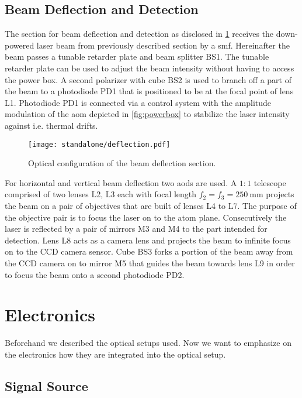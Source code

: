 \subsection{Beam Deflection and Detection}
\label{sec:deflection}

The section for beam deflection and detection as disclosed in
\cref{fig:deflection} receives the down-powered laser beam from previously
described section by a \gls{smf}. Hereinafter the beam passes a tunable
retarder plate and beam splitter BS1. The tunable retarder plate can be used
to adjust the beam intensity without having to access the power box.
A second polarizer with cube BS2 is used to branch off a part of the beam
to a photodiode PD1 that is positioned to be at the focal point of lens L1.
Photodiode PD1 is connected via a control system with the amplitude
modulation of the \gls{aom} depicted in \cref{fig:powerbox} to stabilize
the laser intensity against i.e. thermal drifts.

\begin{figure}[h]
  \centering
  \texttt{[image: standalone/deflection.pdf]}
  \caption{Optical configuration of the beam deflection section.}
  \label{fig:deflection}
\end{figure}

For horizontal and vertical beam deflection two \gls{aod}s are used. A $1:1$
telescope comprised of two lenses L2, L3
each with focal length $f_2=f_3=\SI{250}{\milli\meter}$ projects the beam
on a pair of objectives that are built of lenses L4 to L7. The purpose of the
objective pair is to focus the laser on to the atom plane.
Consecutively the laser is reflected by a pair of mirrors M3 and M4 to the
part intended for detection. Lens L8 acts as a camera lens and projects the
beam to infinite focus on to the CCD camera sensor. Cube BS3 forks a portion
of the beam away from the CCD camera on to mirror M5 that guides the beam
towards lens L9 in order to focus the beam onto a second photodiode PD2.

\section{Electronics}

Beforehand we described the optical setups used. Now we want to emphasize
on the electronics how they are integrated into the optical setup.

\subsection{Signal Source}


